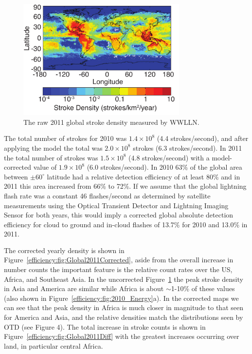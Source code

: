 \begin{figure}[ht!]
   \centering
\noindent\includegraphics[width=20pc]{efficiency/Figures/2012RS005049-p14.pdf}
   \caption{The raw 2011 global stroke density measured by WWLLN.}
   \label{efficiency:fig:Global2011}
\end{figure}

The total number of strokes for 2010 was $1.4\times10^8$ (4.4 strokes/second), and after applying the model the total was $2.0\times10^8$ strokes (6.3 strokes/second).
In 2011 the total number of strokes was $1.5\times10^8$ (4.8 strokes/second) with a model-corrected value of $1.9\times10^8$ (6.0 strokes/second).
In 2010 63\% of the global area between $\pm60^\circ$ latitude had a relative detection efficiency of at least 80\% and in 2011 this area increased from 66\% to 72\%.
If we assume that the global lightning flash rate was a constant 46 flashes/second as determined by satellite measurements using the Optical Transient Detector and Lightning Imaging Sensor \citep{Cecil2011, Christian2003} for both years, this would imply a corrected global absolute detection efficiency for cloud to ground and in-cloud flashes of 13.7\% for 2010 and 13.0\% in 2011.


The corrected yearly density is shown in Figure~\ref{efficiency:fig:Global2011Corrected}, aside from the overall increase in number counts the important feature is the relative count rates over the US, Africa, and Southeast Asia.
In the uncorrected Figure~\ref{efficiency:fig:Global2011} the peak stroke density in Asia and America are similar while Africa is about $\sim$1-10\% of these values (also shown in Figure~\ref{efficiency:fig:2010_Energy}a).
In the corrected maps we can see that the peak density in Africa is much closer in magnitude to that seen for America and Asia, and the relative densities match the distributions seen by OTD (see \citet{Christian2003} Figure 4).
The total increase in stroke counts is shown in Figure~\ref{efficiency:fig:Global2011Diff} with the greatest increases occurring over land, in particular central Africa.

